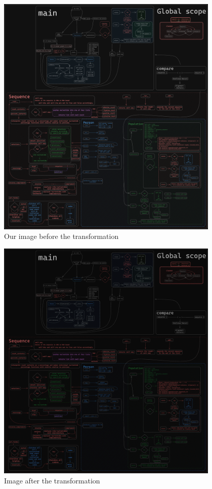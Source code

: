 \documentclass[12pt, a4paper]{article}
\begin{document}
\begin{figure}[H]
    \begin{center}
        \includegraphics[width=0.95\textwidth]{figures/req1b.png}
    \end{center}
    \caption{Our image before the transformation}\label{fig:before}
\end{figure}

\begin{figure}[H]
    \begin{center}
        \includegraphics[width=0.95\textwidth]{figures/req1a.png}
    \end{center}
    \caption{Image after the transformation}\label{fig:after}
\end{figure}
\end{document}
